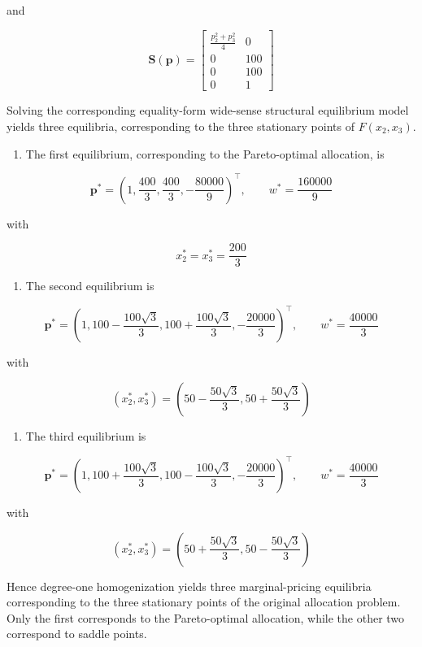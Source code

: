 \documentclass[
  letterpaper,
  DIV=11,
  numbers=noendperiod]{scrreprt}
\providecommand{\tightlist}{%
  \setlength{\itemsep}{0pt}\setlength{\parskip}{0pt}}\usepackage{longtable,booktabs,array}
\begin{document}
and

\[
\mathbf S(\mathbf p)
=
\begin{bmatrix}
\frac{p_2^2+p_3^2}{4} & 0\\
0 & 100\\
0 & 100\\
0 & 1
\end{bmatrix}
\]

Solving the corresponding equality-form wide-sense structural
equilibrium model yields three equilibria, corresponding to the three
stationary points of \(F(x_2,x_3)\).

\begin{enumerate}
\def\labelenumi{\arabic{enumi}.}
\tightlist
\item
  The first equilibrium, corresponding to the Pareto-optimal allocation,
  is
\end{enumerate}

\[
\mathbf p^*
=
\left(
1,
\frac{400}{3},
\frac{400}{3},
-\frac{80000}{9}
\right)^\top,
\qquad
w^*
=
\frac{160000}{9}
\]

with

\[
x_2^*=x_3^*=\frac{200}{3}
\]

\begin{enumerate}
\def\labelenumi{\arabic{enumi}.}
\setcounter{enumi}{1}
\tightlist
\item
  The second equilibrium is
\end{enumerate}

\[
\mathbf p^*
=
\left(
1,
100-\frac{100\sqrt3}{3},
100+\frac{100\sqrt3}{3},
-\frac{20000}{3}
\right)^\top,
\qquad
w^*
=
\frac{40000}{3}
\]

with

\[
(x_2^*,x_3^*)
=
\left(
50-\frac{50\sqrt3}{3},
50+\frac{50\sqrt3}{3}
\right)
\]

\begin{enumerate}
\def\labelenumi{\arabic{enumi}.}
\setcounter{enumi}{2}
\tightlist
\item
  The third equilibrium is
\end{enumerate}

\[
\mathbf p^*
=
\left(
1,
100+\frac{100\sqrt3}{3},
100-\frac{100\sqrt3}{3},
-\frac{20000}{3}
\right)^\top,
\qquad
w^*
=
\frac{40000}{3}
\]

with

\[
(x_2^*,x_3^*)
=
\left(
50+\frac{50\sqrt3}{3},
50-\frac{50\sqrt3}{3}
\right)
\]

Hence degree-one homogenization yields three marginal-pricing equilibria
corresponding to the three stationary points of the original allocation
problem. Only the first corresponds to the Pareto-optimal allocation,
while the other two correspond to saddle points.
\end{document}
